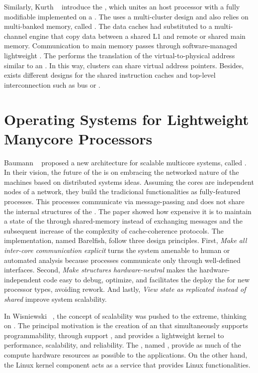 	Similarly, Kurth \etal~\cite{Kurth2017} introduce the \hero, which unites an \arm
	host processor with a fully modifiable \riscv \manycore implemented on a \fpga.
	The \pmca uses a multi-cluster design and also relies on multi-banked memory, called \spm.
	The data caches had substituted to a multi-channel \dma engine that copy data
	between a shared L1 \spm and remote \spms or shared main memory.
	Communication to main memory passes through software-managed lightweight \rab.
	The \rab performs the translation of the virtual-to-physical address similar to an \mmu.
	In this way, clusters can share virtual address pointers.
	Besides, exists different designs for the shared instruction caches and
	top-level interconnection such as bus or \noc.

\section{Operating Systems for Lightweight Manycore Processors}
\label{sec.works.os}

	Baumann \etal~\cite{Baumann2009} proposed a new \os architecture for scalable multicore
	systems, called \multikernel.
	In their vision, the future of the \oses is on embracing the networked nature
	of the machines based on distributed systems ideas.
	Assuming the cores are independent nodes of a network, they build the tradicional
	\os functionalities as fully-featured processes.
	This processes communicate via message-passing and does not share the internal
	structures of the \os.
	The paper showed how expensive it is to maintain a state of the \os through
	shared-memory instead of exchanging messages and the subsequent increase of
	the complexity of cache-coherence protocols.
	The \multikernel implementation, named Barelfish, follow three design principles.
	First, \textit{Make all inter-core communication explicit} turns the system
	amenable to human or automated analysis because processes communicate only
	through well-defined interfaces.
	Second, \textit{Make \os structures hardware-neutral} makes the hardware-independent
	code easy to debug, optimize, and facilitates the deploy the \os for new
	processor types, avoiding rework.
	And lastly, \textit{View \os state as replicated instead of shared} improve system
	scalability.

	In Wisniewski~\cite{Wisniewski2014} \etal, the concept of scalability was pushed
	to the extreme, thinking on \hpc.
	The principal motivation is the creation of an \os that simultaneously supports
	programmability, through support \linux \api, and provides a lightweight kernel
	to performance, scalability, and reliability.
	The \os, named \mos, provide as much of the compute hardware resources as
	possible to the \hpc applications. On the other hand, the Linux kernel
	component acts as a service that provides Linux functionalities.

